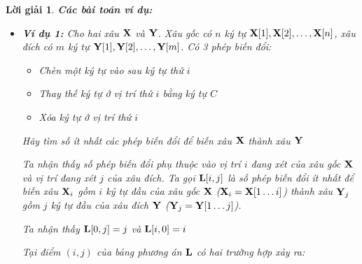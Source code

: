 \documentclass[14pt, a4paper]{article}
\theoremstyle{sltheorem}
\theoremstyle{soltheorem}
\newtheorem*{loigiai}{Lời giải}
\begin{document}
\begin{loigiai}
        \textbf{Các bài toán ví dụ:}

        \begin{itemize} [label={$-$}]
            \item \textbf{Ví dụ 1:}
            Cho hai xâu $\bold{X}$ và $\bold{Y}$. Xâu gốc có $n$ ký tự $\bold{X} \lbrack 1 \rbrack, \bold{X} \lbrack 2 \rbrack, \dots, \bold{X} \lbrack n \rbrack$, xâu đích có $m$ ký tự $\bold{Y} \lbrack 1 \rbrack, \bold{Y} \lbrack 2 \rbrack, \dots, \bold{Y} \lbrack m \rbrack$.
            Có 3 phép biến đổi:
            \begin{itemize} [label={$+$}]
                \item Chèn một ký tự vào sau ký tự thứ $i$
                \item Thay thế ký tự ở vị trí thứ $i$ bằng ký tự $C$
                \item Xóa ký tự ở vị trí thứ $i$
            \end{itemize}
            Hãy tìm số ít nhất các phép biến đổi để biến xâu $\bold{X}$ thành xâu $\bold{Y}$

        Ta nhận thấy số phép biến đổi phụ thuộc vào vị trí $i$ đang xét của xâu gốc $\bold{X}$ và vị trí đang xét $j$ của xâu đích.
        Ta gọi $\bold{L}\lbrack i, j \rbrack$ là số phép biến đổi ít nhất để biến xâu $\bold{X}_i$ gồm $i$ ký tự đầu của xâu gốc $\bold{X}$ ($\bold{X}_i = \bold{X}\lbrack 1 \dots i \rbrack$)
        thành xâu $\bold{Y}_j$ gồm $j$ ký tự đầu của xâu đích $\bold{Y}$ ($\bold{Y}_j=\bold{Y} \lbrack 1 \dots j \rbrack$).
        
        Ta nhận thấy $\bold{L}\lbrack 0, j \rbrack=j$ và $\bold{L}\lbrack i, 0 \rbrack=i$

        Tại điểm $(i, j)$ của bảng phương án $\bold{L}$ có hai trường hợp xảy ra:


\end{itemize}
\end{loigiai}
\end{document}
